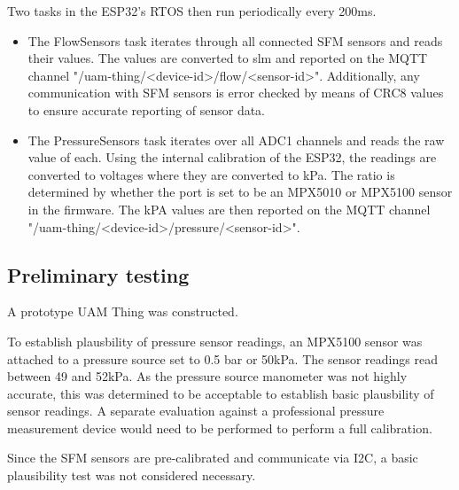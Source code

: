 \documentclass[MME,Projekt,english]{twbook}%
\begin{document}
Two tasks in the ESP32's RTOS then run periodically every 200ms.

\begin{itemize}
\item The FlowSensors task iterates through all connected SFM sensors
and reads their values. The values are converted to slm and reported on the MQTT channel "/uam-thing/<device-id>/flow/<sensor-id>". Additionally,
any communication with SFM sensors is error checked by means of CRC8 values to ensure accurate reporting of sensor data.

\item The PressureSensors task iterates over all ADC1 channels and reads the raw value of each. Using the internal calibration of
the ESP32, the readings are converted to voltages where they are converted to kPa. The ratio is determined by whether the port is
set to be an MPX5010 or MPX5100 sensor in the firmware. The kPA values are then reported on the MQTT channel "/uam-thing/<device-id>/pressure/<sensor-id>".
\end{itemize}

\subsection{Preliminary testing}

A prototype UAM Thing was constructed.

To establish plausbility of pressure sensor readings, an MPX5100 sensor was attached to a pressure source set to 0.5 bar or 50kPa.
The sensor readings read between 49 and 52kPa. As the pressure source manometer was not highly accurate, this was determined to be
acceptable to establish basic plausbility of sensor readings. A separate evaluation against a professional pressure measurement
device would need to be performed to perform a full calibration.

Since the SFM sensors are pre-calibrated and communicate via I2C, a basic plausibility test was not considered necessary.
\end{document}
